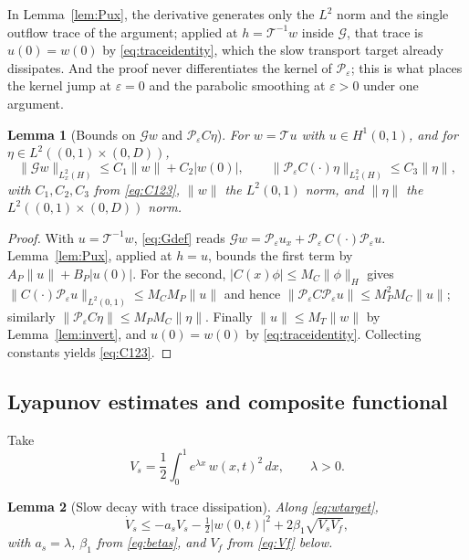 \documentclass[12pt]{article}
\theoremstyle{plain}
\newtheorem{lemma}{Lemma}
\theoremstyle{remark}
\newcommand{\PP}{\mathcal P}
\newcommand{\TT}{\mathcal T}
\newcommand{\Hs}{H}
\begin{document}
In Lemma~\ref{lem:Pux}, the derivative generates only the $L^2$ norm and the single outflow trace of the argument; applied at $h=\TT^{-1}w$ inside $\mathcal G$, that trace is $u(0)=w(0)$ by \eqref{eq:traceidentity}, which the slow transport target already dissipates. And the proof never differentiates the kernel of $\PP_\varepsilon$; this is what places the kernel jump at $\varepsilon=0$ and the parabolic smoothing at $\varepsilon>0$ under one argument.


\begin{lemma}[Bounds on $\mathcal Gw$ and $\PP_\varepsilon C\eta$]\label{lem:Put}
For $w=\TT u$ with $u\in H^1(0,1)$, and for $\eta\in L^2((0,1)\times(0,D))$,
\begin{equation}
 \|\mathcal Gw\|_{L^2_x(\Hs)}
 \le C_1\|w\|+C_2|w(0)|,
 \qquad
 \|\PP_\varepsilon C(\cdot)\eta\|_{L^2_x(\Hs)}
 \le C_3\|\eta\|,
 \label{eq:Putbound}
\end{equation}
with $C_1,C_2,C_3$ from \eqref{eq:C123}, $\|w\|$ the $L^2(0,1)$ norm, and $\|\eta\|$ the $L^2((0,1)\times(0,D))$ norm.
\end{lemma}

\begin{proof}
With $u=\TT^{-1}w$, \eqref{eq:Gdef} reads $\mathcal Gw=\PP_\varepsilon u_x+\PP_\varepsilon\,C(\cdot)\PP_\varepsilon u$. Lemma~\ref{lem:Pux}, applied at $h=u$, bounds the first term by $A_P\|u\|+B_P|u(0)|$. For the second, $|C(x)\phi|\le M_C\|\phi\|_\Hs$ gives $\|C(\cdot)\PP_\varepsilon u\|_{L^2(0,1)}\le M_CM_P\|u\|$ and hence $\|\PP_\varepsilon C\PP_\varepsilon u\|\le M_P^2M_C\|u\|$; similarly $\|\PP_\varepsilon C\eta\|\le M_PM_C\|\eta\|$. Finally $\|u\|\le M_T\|w\|$ by Lemma~\ref{lem:invert}, and $u(0)=w(0)$ by \eqref{eq:traceidentity}. Collecting constants yields \eqref{eq:C123}.
\end{proof}

\subsection{Lyapunov estimates and composite functional}
Take
\begin{equation}
 V_s=\frac12\int_0^1e^{\lambda x}\,w(x,t)^2\,dx,\qquad\lambda>0 .
 \label{eq:Vs}
\end{equation}

\begin{lemma}[Slow decay with trace dissipation]\label{lem:slow}
Along \eqref{eq:wtarget},
\begin{equation}
 \dot V_s\le-a_sV_s-\tfrac12|w(0,t)|^2+2\beta_1\sqrt{V_sV_f},
 \label{eq:Vsdot}
\end{equation}
with $a_s=\lambda$, $\beta_1$ from \eqref{eq:betas}, and $V_f$ from \eqref{eq:Vf} below.
\end{lemma}
\end{document}
